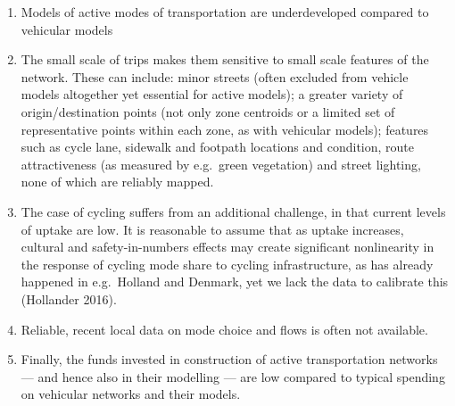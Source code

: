 \documentclass[galley]{jtlu-article-2col}
\providecommand{\tightlist}{%
  \setlength{\itemsep}{0pt}\setlength{\parskip}{0pt}}
\begin{document}
\begin{enumerate}
\def\labelenumi{\arabic{enumi}.}
\tightlist
\item
  Models of active modes of transportation are underdeveloped compared to vehicular models
\item
  The small scale of trips makes them sensitive to small scale features of the network. These can include: minor streets (often excluded from vehicle models altogether yet essential for active models); a greater variety of origin/destination points (not only zone centroids or a limited set of representative points within each zone, as with vehicular models); features such as cycle lane, sidewalk and footpath locations and condition, route attractiveness (as measured by e.g.~green vegetation) and street lighting, none of which are reliably mapped.
\item
  The case of cycling suffers from an additional challenge, in that current levels of uptake are low. It is reasonable to assume that as uptake increases, cultural and safety-in-numbers effects may create significant nonlinearity in the response of cycling mode share to cycling infrastructure, as has already happened in e.g.~Holland and Denmark, yet we lack the data to calibrate this (Hollander 2016).
\item
  Reliable, recent local data on mode choice and flows is often not available.
\item
  Finally, the funds invested in construction of active transportation networks --- and hence also in their modelling --- are low compared to typical spending on vehicular networks and their models.
\end{enumerate}
\end{document}
